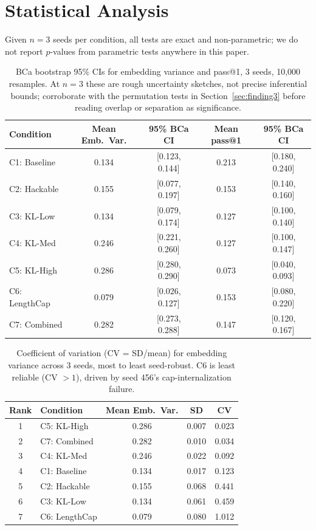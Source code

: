 \documentclass{article}
\begin{document}
\section{Statistical Analysis}
\label{app:stats}

Given $n=3$ seeds per condition, all tests are exact and non-parametric; we do not report $p$-values from parametric tests anywhere in this paper.

\begin{table}[h]
\centering
\caption{BCa bootstrap 95\% CIs for embedding variance and pass@1, 3 seeds, 10,000 resamples. At $n=3$ these are rough uncertainty sketches, not precise inferential bounds; corroborate with the permutation tests in Section~\ref{sec:finding3} before reading overlap or separation as significance.}
\label{tab:bootstrap_ci}
\small
\begin{tabular}{lcccc}
\toprule
\textbf{Condition} & \textbf{Mean Emb.\ Var.} & \textbf{95\% BCa CI} & \textbf{Mean pass@1} & \textbf{95\% BCa CI} \\
\midrule
C1: Baseline  & 0.134 & [0.123, 0.144] & 0.213 & [0.180, 0.240] \\
C2: Hackable  & 0.155 & [0.077, 0.197] & 0.153 & [0.140, 0.160] \\
C3: KL-Low    & 0.134 & [0.079, 0.174] & 0.127 & [0.100, 0.140] \\
C4: KL-Med    & 0.246 & [0.221, 0.260] & 0.127 & [0.100, 0.147] \\
C5: KL-High   & 0.286 & [0.280, 0.290] & 0.073 & [0.040, 0.093] \\
C6: LengthCap & 0.079 & [0.026, 0.127] & 0.153 & [0.080, 0.220] \\
C7: Combined  & 0.282 & [0.273, 0.288] & 0.147 & [0.120, 0.167] \\
\bottomrule
\end{tabular}
\end{table}

\begin{table}[h]
\centering
\caption{Coefficient of variation (CV = SD/mean) for embedding variance across 3 seeds, most to least seed-robust. C6 is least reliable (CV $>1$), driven by seed 456's cap-internalization failure.}
\label{tab:cv_ranking}
\small
\begin{tabular}{clccc}
\toprule
\textbf{Rank} & \textbf{Condition} & \textbf{Mean Emb.\ Var.} & \textbf{SD} & \textbf{CV} \\
\midrule
1 & C5: KL-High  & 0.286 & 0.007 & 0.023 \\
2 & C7: Combined & 0.282 & 0.010 & 0.034 \\
3 & C4: KL-Med   & 0.246 & 0.022 & 0.092 \\
4 & C1: Baseline & 0.134 & 0.017 & 0.123 \\
5 & C2: Hackable & 0.155 & 0.068 & 0.441 \\
6 & C3: KL-Low   & 0.134 & 0.061 & 0.459 \\
7 & C6: LengthCap& 0.079 & 0.080 & 1.012 \\
\bottomrule
\end{tabular}
\end{table}
\end{document}
